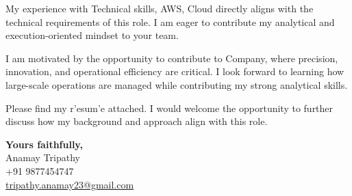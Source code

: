 \documentclass[11pt,a4]{article}
\begin{document}
My experience with Technical skills, AWS, Cloud directly aligns with the technical requirements of this role. I am eager to contribute my analytical and execution-oriented mindset to your team.

I am motivated by the opportunity to contribute to Company, where precision, innovation, and operational efficiency are critical. I look forward to learning how large-scale operations are managed while contributing my strong analytical skills.

Please find my r'esum'e attached. I would welcome the opportunity to further discuss how my background and approach align with this role.

\vspace{0.5cm}
\textbf{Yours faithfully,} \\[6pt]
Anamay Tripathy \\
+91 9877454747 \\
\href{mailto:tripathy.anamay23@gmail.com}{tripathy.anamay23@gmail.com}
\end{document}
